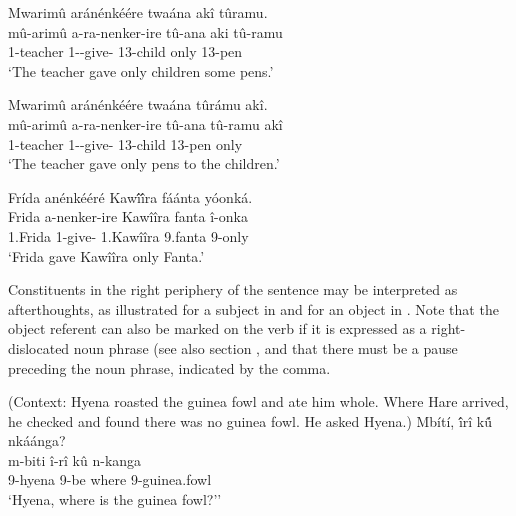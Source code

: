 \documentclass[output=paper]{langscibook}
\begin{document}
\z

\ea
\label{bkm:Ref89972089}
\ea
Mwarimû aránénkéére twaána akî tûramu.\\
\gll
mû-arimû  a-ra-nenker-ire  tû-ana  aki  tû-ramu\\
1-teacher  1\SM-\YPST{}-give-\PFV{}  13-child  only  13-pen\\
\glt
‘The teacher gave only children some pens.’

\ex
Mwarimû aránénkéére twaána tûrámu akî.\\
\gll
mû-arimû  a-ra-nenker-ire  tû-ana  tû-ramu  akî\\
1-teacher  1\SM-\YPST{}-give-\PFV{} 13-child  13-pen  only\\
\glt
‘The teacher gave only pens to the children.’

\z
\z


\ea
\label{bkm:Ref89972091}
Frída anénkééré Kaw\'{î}\'{î}ra fáánta yóonká.\\
\gll
Frida  a-nenker-ire  Kawîîra  fanta  î-onka\\
1.Frida {1\SM{}-give-\PFV{}} 1.Kawîîra  9.fanta  9-only \\
\glt
‘Frida gave Kawîîra only Fanta.’

\z

Constituents in the right periphery of the sentence may be interpreted as afterthoughts, as illustrated for a subject in  and for an object in . Note that the object referent can also be marked on the verb if it is expressed as a right-dislocated noun phrase (see also section , and that there must be a pause preceding the noun phrase, indicated by the comma.


\ea
\label{bkm:Ref119918606}
(Context: Hyena roasted the guinea fowl and ate him whole. Where Hare arrived, he checked and found there was no guinea fowl. He asked Hyena.)
Mbítí, \'{î}rî k\'{û} nkáánga?\\
\gll
m-biti  î-rî  kû  n-kanga\\
9-hyena 9\SM{}-be  where  9-guinea.fowl\\
\glt
‘Hyena, where is the guinea fowl?’’

\z
\end{document}
